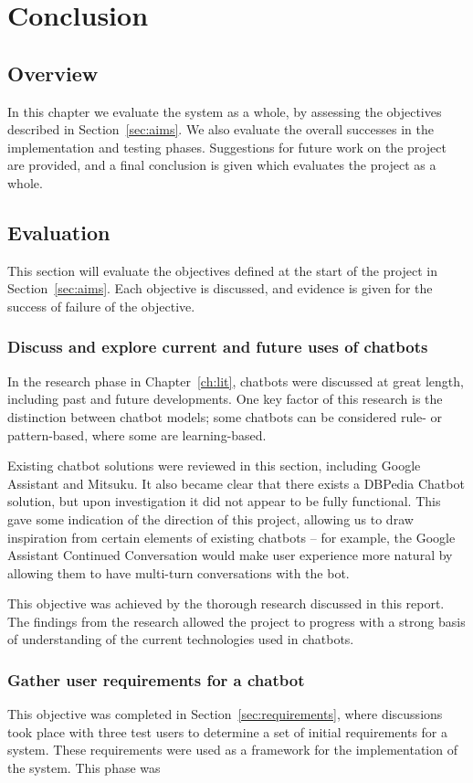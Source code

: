 \chapter{Conclusion}
\label{ch:conclusion}
\section{Overview}
In this chapter we evaluate the system as a whole, by assessing the objectives described in Section~\ref{sec:aims}. We also evaluate the overall successes in the implementation and testing phases. Suggestions for future work on the project are provided, and a final conclusion is given which evaluates the project as a whole.
\section{Evaluation}
This section will evaluate the objectives defined at the start of the project in Section~\ref{sec:aims}. Each objective is discussed, and evidence is given for the success of failure of the objective. 

\subsection{Discuss and explore current and future uses of chatbots}
In the research phase in Chapter~\ref{ch:lit}, chatbots were discussed at great length, including past and future developments. One key factor of this research is the distinction between chatbot models; some chatbots can be considered rule- or pattern-based, where some are learning-based.

Existing chatbot solutions were reviewed in this section, including Google Assistant and Mitsuku. It also became clear that there exists a DBPedia Chatbot solution, but upon investigation it did not appear to be fully functional. This gave some indication of the direction of this project, allowing us to draw inspiration from certain elements of existing chatbots -- for example, the Google Assistant Continued Conversation \cite{googleassistant} would make user experience more natural by allowing them to have multi-turn conversations with the bot.

This objective was achieved by the thorough research discussed in this report. The findings from the research allowed the project to progress with a strong basis of understanding of the current technologies used in chatbots.

\subsection{Gather user requirements for a chatbot}
This objective was completed in Section~\ref{sec:requirements}, where discussions took place with three test users to determine a set of initial requirements for a system. These requirements were used as a framework for the implementation of the system. This phase was 


